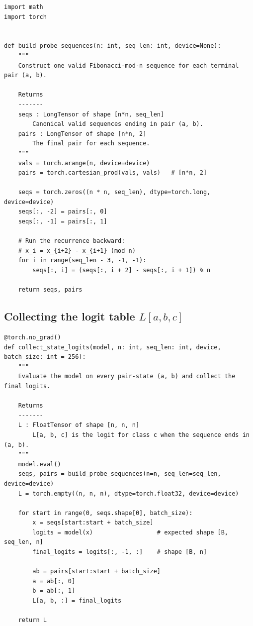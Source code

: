 \documentclass[11pt]{article}
\begin{document}
\begin{lstlisting}[style=pythonstyle]
import math
import torch


def build_probe_sequences(n: int, seq_len: int, device=None):
    """
    Construct one valid Fibonacci-mod-n sequence for each terminal pair (a, b).

    Returns
    -------
    seqs : LongTensor of shape [n*n, seq_len]
        Canonical valid sequences ending in pair (a, b).
    pairs : LongTensor of shape [n*n, 2]
        The final pair for each sequence.
    """
    vals = torch.arange(n, device=device)
    pairs = torch.cartesian_prod(vals, vals)   # [n*n, 2]

    seqs = torch.zeros((n * n, seq_len), dtype=torch.long, device=device)
    seqs[:, -2] = pairs[:, 0]
    seqs[:, -1] = pairs[:, 1]

    # Run the recurrence backward:
    # x_i = x_{i+2} - x_{i+1} (mod n)
    for i in range(seq_len - 3, -1, -1):
        seqs[:, i] = (seqs[:, i + 2] - seqs[:, i + 1]) % n

    return seqs, pairs
\end{lstlisting}

\subsection{Collecting the logit table $L[a,b,c]$}

\begin{lstlisting}[style=pythonstyle]
@torch.no_grad()
def collect_state_logits(model, n: int, seq_len: int, device, batch_size: int = 256):
    """
    Evaluate the model on every pair-state (a, b) and collect the final logits.

    Returns
    -------
    L : FloatTensor of shape [n, n, n]
        L[a, b, c] is the logit for class c when the sequence ends in (a, b).
    """
    model.eval()
    seqs, pairs = build_probe_sequences(n=n, seq_len=seq_len, device=device)
    L = torch.empty((n, n, n), dtype=torch.float32, device=device)

    for start in range(0, seqs.shape[0], batch_size):
        x = seqs[start:start + batch_size]
        logits = model(x)                  # expected shape [B, seq_len, n]
        final_logits = logits[:, -1, :]    # shape [B, n]

        ab = pairs[start:start + batch_size]
        a = ab[:, 0]
        b = ab[:, 1]
        L[a, b, :] = final_logits

    return L
\end{lstlisting}
\end{document}
